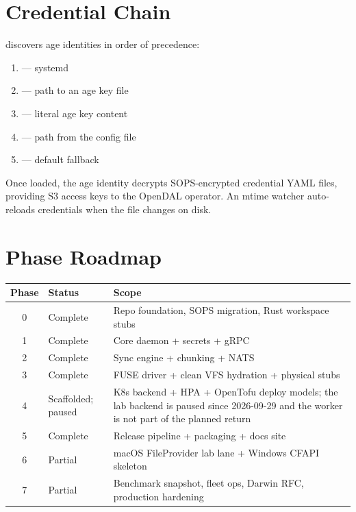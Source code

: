 \documentclass[11pt,a4paper]{article}
\begin{document}
\section{Credential Chain}

\tcfsd{} discovers age identities in order of precedence:

\begin{enumerate}
  \item {} --- systemd
  \item {} --- path to an age key file
  \item {} --- literal age key content
  \item {} --- path from the config file
  \item {} --- default fallback
\end{enumerate}

Once loaded, the age identity decrypts SOPS-encrypted credential YAML files,
providing S3 access keys to the OpenDAL operator. An mtime watcher
auto-reloads credentials when the file changes on disk.

\section{Phase Roadmap}

\begin{longtable}{clp{9cm}}
  \toprule
  \textbf{Phase} & \textbf{Status} & \textbf{Scope} \\
  \midrule
  \endhead
  0 & Complete & Repo foundation, SOPS migration, Rust workspace stubs \\
  1 & Complete & Core daemon + secrets + gRPC \\
  2 & Complete & Sync engine + chunking + NATS \\
  3 & Complete & FUSE driver + clean VFS hydration + physical stubs \\
  4 & Scaffolded; paused & K8s backend + HPA + OpenTofu deploy models; the lab backend is paused since 2026-09-29 and the worker is not part of the planned return \\
  5 & Complete & Release pipeline + packaging + docs site \\
  6 & Partial & macOS FileProvider lab lane + Windows CFAPI skeleton \\
  7 & Partial & Benchmark snapshot, fleet ops, Darwin RFC, production hardening \\
  \bottomrule
\end{longtable}
\end{document}
